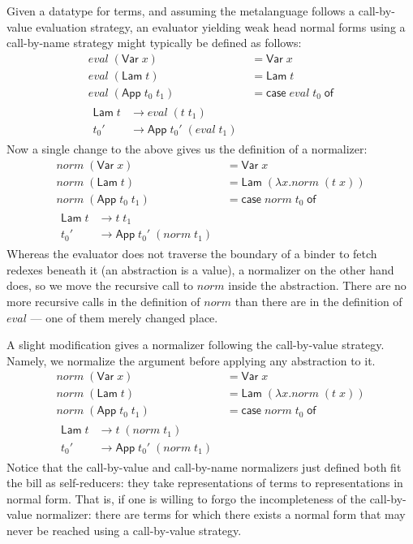 \documentclass[a4paper]{amsart}
\newcommand{\Var}{\mathsf{Var}\;}
\newcommand{\Lam}{\mathsf{Lam}\;}
\newcommand{\App}{\mathsf{App}\;}
\newcommand{\case}[2]{\mathsf{case}\;#1\;\mathsf{of} \\ #2}
\begin{document}
Given a datatype for terms, and assuming the metalanguage follows a
call-by-value evaluation strategy, an evaluator yielding weak head
normal forms using a call-by-name strategy might typically be defined
as follows:
\begin{align*}
  eval\;(\Var x) &= \Var x \\
  eval\;(\Lam t) &= \Lam t \\
  eval\;(\App t_0\;t_1) &= \case{eval\;t_0}{
    \begin{split}
      \Lam t &\rightarrow eval\;(t\;t_1) \\
      t_0' &\rightarrow \App t_0'\;(eval\;t_1)
    \end{split}
    }
\end{align*}
Now a single change to the above gives us the definition of a normalizer:
\begin{align*}
  norm\;(\Var x) &= \Var x \\
  norm\;(\Lam t) &= \Lam (\lambda x. norm\;(t\;x)) \\
  norm\;(\App t_0\;t_1) &= \case{norm\;t_0}{
    \begin{split}
      \Lam t &\rightarrow t\;t_1 \\
      t_0' &\rightarrow \App t_0'\;(norm\;t_1)
    \end{split}
    }
\end{align*}
Whereas the evaluator does not traverse the boundary of a binder to fetch
redexes beneath it (an abstraction is a value), a normalizer on the other hand
does, so we move the recursive call to $norm$ inside the abstraction. There
are no more recursive calls in the definition of $norm$ than there are in the
definition of $eval$ --- one of them merely changed place.

A slight modification gives a normalizer following the call-by-value strategy.
Namely, we normalize the argument before applying any abstraction to it.
\begin{align*}
  norm\;(\Var x) &= \Var x \\
  norm\;(\Lam t) &= \Lam (\lambda x. norm\;(t\;x)) \\
  norm\;(\App t_0\;t_1) &= \case{norm\;t_0}{
    \begin{split}
      \Lam t &\rightarrow t\;(norm\;t_1) \\
      t_0' &\rightarrow \App t_0'\;(norm\;t_1)
    \end{split}
    }
\end{align*}
Notice that the call-by-value and call-by-name normalizers just defined both
fit the bill as self-reducers: they take representations of terms to
representations in normal form. That is, if one is willing to forgo the
incompleteness of the call-by-value normalizer: there are terms for which
there exists a normal form that may never be reached using a call-by-value
strategy.
\end{document}
